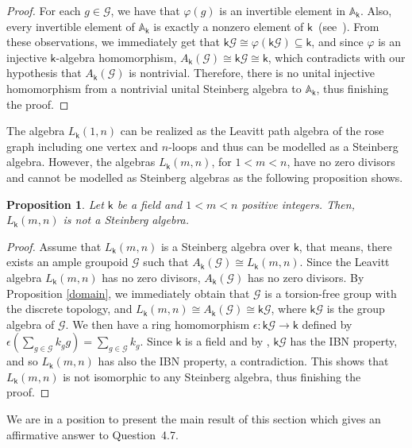 \documentclass[a4paper, 11pt, reqno]{amsart}
\newtheorem{prop}[thm]{Proposition}
\theoremstyle{definition}
\let\phi\varphi
\def\mG{\mathcal{G}}
\newcommand{\K}{\mathsf{k}}
\begin{document}
\begin{proof}
For each $g\in \mG$, we have that $\phi(g)$ is an invertible element in $\mathbb A_\K$. Also, every invertible element of $\mathbb A_\K$ is exactly a nonzero element of $\K$~(see~\cite[Section 2.2]{Cou95}). From these observations, we immediately get that $\K\mG\cong\phi(\K\mG) \subseteq \K$, and since $\phi$ is an injective $\K$-algebra homomorphism, $A_\K(\mG)\cong \K\mG \cong \K$, which contradicts with our hypothesis that $A_\K(\mG)$ is nontrivial. Therefore, there is no unital injective homomorphism from a nontrivial unital Steinberg algebra to $\mathbb A_\K$, thus finishing the proof.
\end{proof}



The algebra $L_\K(1,n)$ can be realized as the Leavitt path   algebra of the rose graph including one vertex and $n$-loops and thus can be modelled as a Steinberg algebra.  However,  the algebras $L_\K(m,n)$, for $1<m<n$, have no zero divisors and cannot be modelled as Steinberg algebras as the following proposition shows.

\begin{prop}
Let $\K$ be a field and $1 < m <n$ positive integers. Then, $L_\K(m, n)$ is not a Steinberg algebra.
\end{prop}
\begin{proof}
Assume that $L_\K(m, n)$ is a Steinberg algebra over $\K$, that means, there exists an ample groupoid $\mathcal{G}$ such that $A_\K(\mathcal{G})\cong L_\K(m, n)$. Since the Leavitt algebra $L_\K(m, n)$  has no zero divisors,  $A_\K(\mG)$  has no zero divisors. By Proposition \ref{domain}, we immediately obtain that $\mathcal{G}$ is a torsion-free group with the discrete topology, and  $L_\K(m,n) \cong A_\K(\mathcal{G})\cong \K\mathcal{G}$, where $\K\mathcal{G}$ is the group algebra of $\mG$. We then have a ring homomorphism $\epsilon: \K\mG \longrightarrow \K$ defined by $\epsilon(\sum_{g\in \mG}k_gg) = \sum_{g\in \mG}k_g$. Since $\K$ is a field and by \cite[Remark 1.5]{Lam99}, $\K\mathcal{G}$ has the IBN property, and so $L_\K(m, n)$ has also the IBN property, a contradiction. This shows that $L_\K(m, n)$ is not isomorphic to any Steinberg algebra, thus finishing the proof.
\end{proof}


We are in a position to present the main result of this section which gives  an affirmative answer to Question~4.7. 
\end{document}
